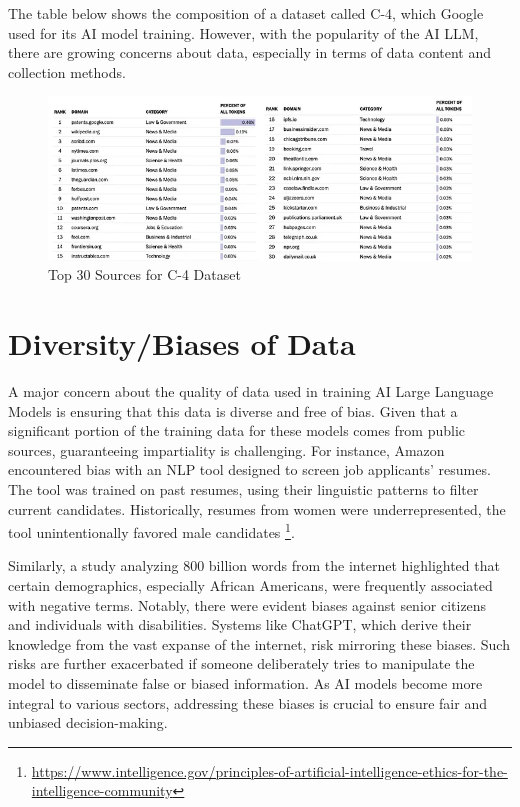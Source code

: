 \documentclass[
]{book}
\begin{document}
The table below shows the composition of a dataset called C-4, which Google used for its AI model training. However, with the popularity of the AI LLM, there are growing concerns about data, especially in terms of data content and collection methods.

\begin{figure}
\centering
\includegraphics{figures/figure5.png}
\caption{Top 30 Sources for C-4 Dataset}
\end{figure}

\hypertarget{diversitybiases-of-data}{%
\section{Diversity/Biases of Data}\label{diversitybiases-of-data}}

A major concern about the quality of data used in training AI Large Language Models is ensuring that this data is diverse and free of bias. Given that a significant portion of the training data for these models comes from public sources, guaranteeing impartiality is challenging. For instance, Amazon encountered bias with an NLP tool designed to screen job applicants' resumes. The tool was trained on past resumes, using their linguistic patterns to filter current candidates. Historically, resumes from women were underrepresented, the tool unintentionally favored male candidates \footnote{\url{https://www.intelligence.gov/principles-of-artificial-intelligence-ethics-for-the-intelligence-community}}.

Similarly, a study analyzing 800 billion words from the internet highlighted that certain demographics, especially African Americans, were frequently associated with negative terms. Notably, there were evident biases against senior citizens and individuals with disabilities. Systems like ChatGPT, which derive their knowledge from the vast expanse of the internet, risk mirroring these biases. Such risks are further exacerbated if someone deliberately tries to manipulate the model to disseminate false or biased information. As AI models become more integral to various sectors, addressing these biases is crucial to ensure fair and unbiased decision-making.
\end{document}
